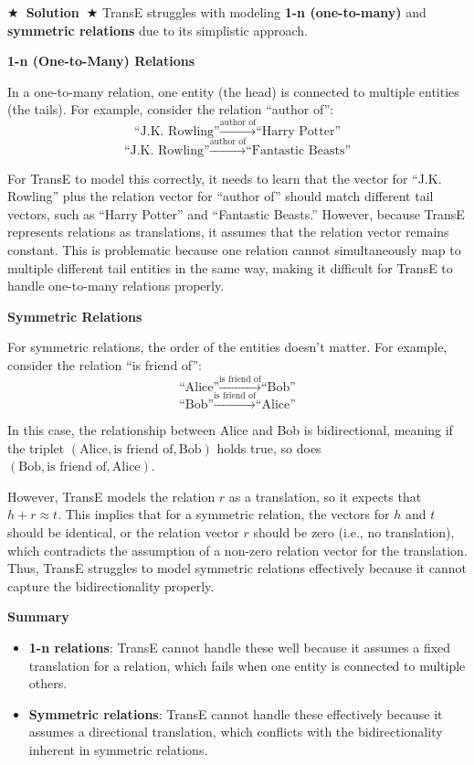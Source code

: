 \documentclass[11pt]{article}
\numberwithin{figure}{section}
\newcommand{\Solution}[1]{{\medskip \color{red} \bf $\bigstar$~\sf \textbf{Solution}~$\bigstar$ \sf #1 } \bigskip}
\begin{document}
\Solution{}
TransE struggles with modeling \textbf{1-n (one-to-many)} and \textbf{symmetric relations} due to its simplistic approach.

\textbf{1-n (One-to-Many) Relations}

In a one-to-many relation, one entity (the head) is connected to multiple entities (the tails). For example, consider the relation ``author of'':
$$
\text{``J.K. Rowling''} \xrightarrow{\text{author of}} \text{``Harry Potter''}
$$
$$
\text{``J.K. Rowling''} \xrightarrow{\text{author of}} \text{``Fantastic Beasts''}
$$

For TransE to model this correctly, it needs to learn that the vector for ``J.K. Rowling'' plus the relation vector for ``author of'' should match different tail vectors, such as ``Harry Potter'' and ``Fantastic Beasts.'' However, because TransE represents relations as translations, it assumes that the relation vector remains constant. This is problematic because one relation cannot simultaneously map to multiple different tail entities in the same way, making it difficult for TransE to handle one-to-many relations properly.

\textbf{Symmetric Relations}

For symmetric relations, the order of the entities doesn't matter. For example, consider the relation ``is friend of'':
$$
\text{``Alice''} \xrightarrow{\text{is friend of}} \text{``Bob''}
$$
$$
\text{``Bob''} \xrightarrow{\text{is friend of}} \text{``Alice''}
$$

In this case, the relationship between Alice and Bob is bidirectional, meaning if the triplet $(\text{Alice}, \text{is friend of}, \text{Bob})$ holds true, so does \((\text{Bob}, \text{is friend of}, \text{Alice})\).

However, TransE models the relation $r$ as a translation, so it expects that $h + r \approx t$. This implies that for a symmetric relation, the vectors for \(h\) and \(t\) should be identical, or the relation vector \(r\) should be zero (i.e., no translation), which contradicts the assumption of a non-zero relation vector for the translation. Thus, TransE struggles to model symmetric relations effectively because it cannot capture the bidirectionality properly.

\textbf{Summary}

\begin{itemize}
    \item \textbf{1-n relations}: TransE cannot handle these well because it assumes a fixed translation for a relation, which fails when one entity is connected to multiple others.
    \item \textbf{Symmetric relations}: TransE cannot handle these effectively because it assumes a directional translation, which conflicts with the bidirectionality inherent in symmetric relations.
\end{itemize}
\end{document}
